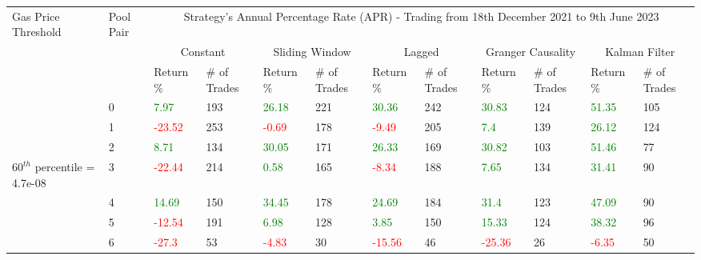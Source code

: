 \begin{table}[htb!]
    \centering
    \begin{adjustwidth}{-0.9in}{-0.9in}
        \begin{tabular}{|p{5em}|p{2em}|p{3em}|p{3em}|p{3em}|p{3em}|p{3em}|p{3em}|p{3em}|p{3em}|p{3em}|p{3em}|}\hline
            Gas Price Threshold & Pool Pair & \multicolumn{10}{|c|}{Strategy's Annual Percentage Rate (APR) - Trading from 18th December 2021 to 9th June 2023} \\\cline{3-12}
            &   & \multicolumn{2}{|c|}{Constant} & \multicolumn{2}{|c|}{Sliding Window} & \multicolumn{2}{|c|}{Lagged} & \multicolumn{2}{|c|}{Granger Causality} & \multicolumn{2}{|c|}{Kalman Filter}\\\cline{3-12}
            & & Return \% & \# of Trades & Return \% & \# of Trades & Return \% & \# of Trades & Return \% & \# of Trades & Return \% & \# of Trades\\\hline

            & 0 & \textcolor{green}{7.97} & 193 & \textcolor{green}{26.18} & 221 & \textcolor{green}{30.36} & 242 & \textcolor{green}{30.83} & 124 & \textcolor{green}{51.35} & 105\\\cline{3-12}
            & 1 & \textcolor{red}{-23.52} & 253 & \textcolor{red}{-0.69} & 178 & \textcolor{red}{-9.49} & 205 & \textcolor{green}{7.4} & 139 & \textcolor{green}{26.12} & 124\\\cline{3-12}
            & 2 & \textcolor{green}{8.71} & 134 & \textcolor{green}{30.05} & 171 & \textcolor{green}{26.33} & 169 & \textcolor{green}{30.82} & 103 & \textcolor{green}{51.46} & 77\\\cline{3-12}
            $60^{th}$ percentile = 4.7e-08 & 3 & \textcolor{red}{-22.44} & 214 & \textcolor{green}{0.58} & 165 & \textcolor{red}{-8.34} & 188 & \textcolor{green}{7.65} & 134 & \textcolor{green}{31.41} & 90\\[-5.5ex]\cline{3-12}
            & 4 & \textcolor{green}{14.69} & 150 & \textcolor{green}{34.45} & 178 & \textcolor{green}{24.69} & 184 & \textcolor{green}{31.4} & 123 & \textcolor{green}{47.09} & 90\\\cline{3-12}
            & 5 & \textcolor{red}{-12.54} & 191 & \textcolor{green}{6.98} & 128 & \textcolor{green}{3.85} & 150 & \textcolor{green}{15.33} & 124 & \textcolor{green}{38.32} & 96\\\cline{3-12}
            & 6 & \textcolor{red}{-27.3} & 53 & \textcolor{red}{-4.83} & 30 & \textcolor{red}{-15.56} & 46 & \textcolor{red}{-25.36} & 26 & \textcolor{red}{-6.35} & 50\\\hline\hline


\end{tabular}
\end{adjustwidth}
\end{table}
